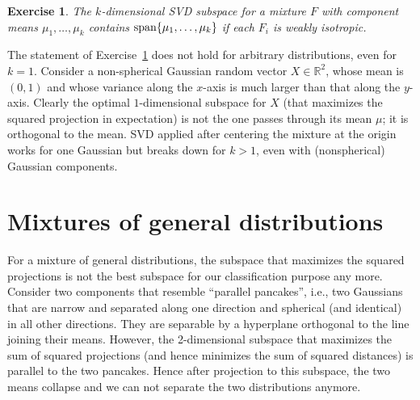 \documentclass{book}
\newtheorem{exercise}{Exercise}
\numberwithin{exercise}{chapter}
\begin{document}
\begin{exercise}\label{theorem:svd.isotropic}
The $k$-dimensional SVD subspace for a mixture $F$ with component means $\mu_1, \ldots, \mu_k$ contains
$\hbox{span}\{\mu_1,\dots,\mu_k\}$ if each $F_i$ is weakly isotropic.
\end{exercise}

The statement of Exercise~\ref{theorem:svd.isotropic} does not hold for arbitrary distributions, even for $k=1$. Consider a non-spherical Gaussian random vector $X\in\mathbb R^2$, whose mean is $(0,1)$ and whose variance along the $x$-axis is much larger than that along the $y$-axis. Clearly the optimal $1$-dimensional subspace for $X$ (that maximizes the squared projection in expectation) is not the one passes through its mean $\mu$; it is orthogonal to the mean. SVD applied after centering the mixture at the origin works for one Gaussian but breaks down for $k > 1$, even with (nonspherical) Gaussian components.


\section{Mixtures of general distributions}\label{sec:genmix}
For a mixture of general distributions, the subspace that maximizes the squared projections is not the best subspace for our classification purpose any more. Consider two components that resemble ``parallel pancakes'', i.e., two Gaussians that are narrow and separated along one direction and spherical (and identical) in all other directions. They are separable by a hyperplane orthogonal to the line joining their means. However, the 2-dimensional subspace that maximizes the sum of squared projections (and hence minimizes the sum of squared distances)
is parallel to the two pancakes. Hence after projection to this subspace, the two means collapse and we can not separate
the two distributions anymore.

\end{document}

